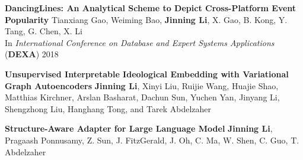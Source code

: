 \documentclass[12pt, letterpaper]{article}
\newcommand{\mhead}[1]{\leavevmode\marginpar{\sffamily\footnotesize #1}}
\begin{document}
\textbf{DancingLines: An Analytical Scheme to Depict Cross-Platform Event Popularity}
\href{http://jinningli.cn/cv/dancinglines.pdf}{}\href{https://github.com/jinningli/dancinglines}{}\newline
\footnotesize
Tianxiang Gao, Weiming Bao, \textbf{Jinning Li}, X. Gao, B. Kong, Y. Tang, G. Chen, X. Li\\
In \emph{International Conference on Database and Expert Systems Applications} (\textbf{DEXA}) 2018
\small

\medskip \newpage %
\mhead{\normalsize{Manuscripts}}\small
\textbf{Unsupervised Interpretable Ideological Embedding with Variational Graph Autoencoders}
\href{http://jinningli.cn/files/papers/interpretable.pdf}{}
\newline
\footnotesize
\textbf{Jinning Li}, Xinyi Liu, Ruijie Wang, Huajie Shao, Matthias Kirchner, Arslan Basharat, Dachun Sun, Yuchen Yan, Jinyang Li, Shengzhong Liu, Hanghang Tong, and Tarek Abdelzaher
\small
\vspace{2pt}

\textbf{Structure-Aware Adapter for Large Language Model}
\href{http://jinningli.cn/files/papers/structure_aware.pdf}{}
\newline
\footnotesize
\textbf{Jinning Li}, Pragaash Ponnusamy, Z. Sun, J. FitzGerald, J. Oh, C. Ma, W. Shen, C. Guo, T. Abdelzaher
\small
\vspace{2pt}

%
\end{document}

